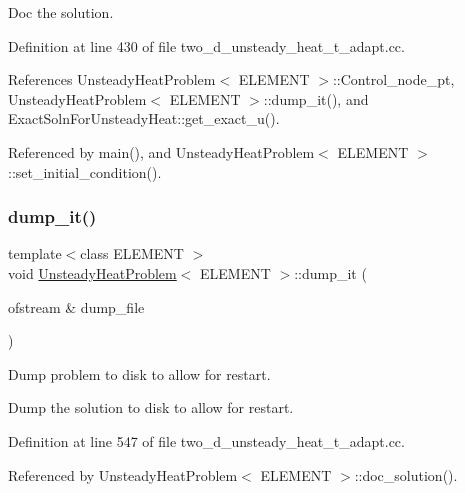 Doc the solution. 



Definition at line 430 of file two\+\_\+d\+\_\+unsteady\+\_\+heat\+\_\+t\+\_\+adapt.\+cc.



References Unsteady\+Heat\+Problem$<$ E\+L\+E\+M\+E\+N\+T $>$\+::\+Control\+\_\+node\+\_\+pt, Unsteady\+Heat\+Problem$<$ E\+L\+E\+M\+E\+N\+T $>$\+::dump\+\_\+it(), and Exact\+Soln\+For\+Unsteady\+Heat\+::get\+\_\+exact\+\_\+u().



Referenced by main(), and Unsteady\+Heat\+Problem$<$ E\+L\+E\+M\+E\+N\+T $>$\+::set\+\_\+initial\+\_\+condition().

\mbox{\label{classUnsteadyHeatProblem_a9a60874a6471414819301705f1a2afd1}} 
\subsubsection{\texorpdfstring{dump\+\_\+it()}{dump\_it()}}
{\footnotesize\ttfamily template$<$class E\+L\+E\+M\+E\+NT $>$ \\
void \hyperlink{classUnsteadyHeatProblem}{Unsteady\+Heat\+Problem}$<$ E\+L\+E\+M\+E\+NT $>$\+::dump\+\_\+it (\begin{DoxyParamCaption}\item[{ofstream \&}]{dump\+\_\+file }\end{DoxyParamCaption})}



Dump problem to disk to allow for restart. 

Dump the solution to disk to allow for restart. 

Definition at line 547 of file two\+\_\+d\+\_\+unsteady\+\_\+heat\+\_\+t\+\_\+adapt.\+cc.



Referenced by Unsteady\+Heat\+Problem$<$ E\+L\+E\+M\+E\+N\+T $>$\+::doc\+\_\+solution().

\mbox{\label{classUnsteadyHeatProblem_a888e25dd97e89d31e485cb188721dbe1}} 
